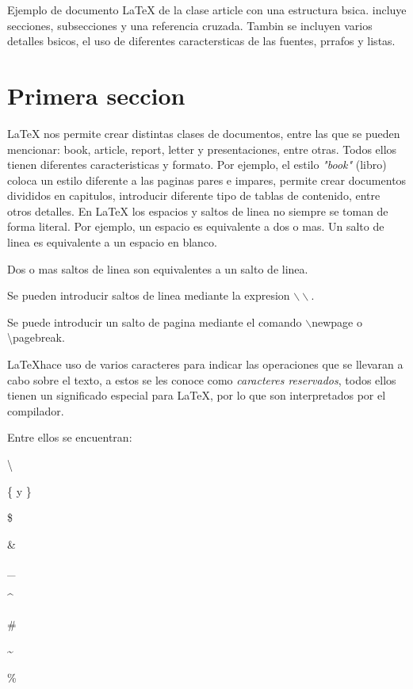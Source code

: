 \documentclass[letterpaper,11pt]{article}
\begin{document}
Ejemplo de documento \LaTeX{} de la clase {\ttfamily article} con una estructura bsica. 
incluye secciones, subsecciones y una referencia cruzada. Tambin se incluyen varios 
detalles bsicos, el uso de diferentes caractersticas de las fuentes, prrafos y listas.

\section{Primera seccion}\label{primera}

\LaTeX{} nos permite crear distintas clases de documentos, entre las que se pueden mencionar: 
book, article, report, letter y presentaciones, entre otras.
Todos ellos tienen diferentes caracteristicas y formato. Por ejemplo, el estilo \textit{"book"} 
(libro) coloca un estilo diferente a las paginas pares e impares, permite crear documentos 
divididos en capitulos, introducir diferente  tipo de tablas de contenido, entre otros detalles.
En \LaTeX{} los espacios y saltos de linea no siempre se toman de forma literal.
Por ejemplo, un espacio        es      equivalente a      dos o mas. 
Un salto de linea es equivalente a un espacio en blanco.

Dos o mas saltos de linea son equivalentes a un salto de linea.

Se pueden introducir saltos de linea mediante la expresion $\backslash\backslash$.

Se puede introducir un salto de pagina mediante el comando $\backslash$newpage o \textbackslash pagebreak.


\LaTeX hace uso de varios caracteres para indicar las operaciones que se llevaran a cabo sobre el texto, a estos se les conoce como \emph{caracteres reservados}, todos ellos tienen un significado especial para \LaTeX, por lo que son interpretados por el compilador.

Entre ellos se encuentran:

\textbackslash

\{ y \}

\$

\&

\_

\^{}

\#

\~{}

\%
\end{document}
